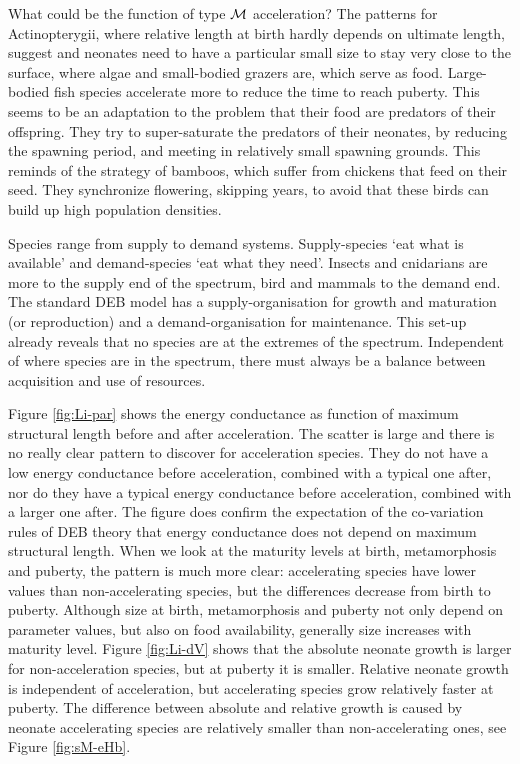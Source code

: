 What could be the function of type $\cal M$ acceleration?
The patterns for Actinopterygii, where relative length at birth hardly depends on ultimate length, suggest and neonates need to have a particular small size to stay very close to the surface, where algae and small-bodied grazers are, which serve as food. 
Large-bodied fish species accelerate more to reduce the time to reach puberty.
This seems to be an adaptation to the problem that their food are predators of their offspring.
They try to super-saturate the predators of their neonates, by reducing the spawning period, and meeting in relatively small spawning grounds.
This reminds of the strategy of bamboos, which suffer from chickens that feed on their seed. 
They synchronize flowering, skipping years, to avoid that these birds can build up high population densities.

Species range from supply to demand systems. 
Supply-species `eat what is available' and demand-species `eat what they need'.
Insects and cnidarians are more to the supply end of the spectrum, bird and mammals to the demand end.
The standard DEB model has a supply-organisation for growth and maturation (or reproduction) and a demand-organisation for maintenance.
This set-up already reveals that no species are at the extremes of the spectrum.
Independent of where species are in the spectrum, there must always be a balance between acquisition and use of resources.

Figure \ref{fig:Li-par} shows the energy conductance as function of maximum structural length before and after acceleration.
The scatter is large and there is no really clear pattern to discover for acceleration species.
They do not have a low energy conductance before acceleration, combined with a typical one after, nor do they have a typical energy conductance before acceleration, combined with a larger one after.
The figure does confirm the expectation of the co-variation rules of DEB theory that energy conductance does not depend on maximum structural length.
When we look at the maturity levels at birth, metamorphosis and puberty, the pattern is much more clear:
accelerating species have lower values than non-accelerating species, but the differences decrease from birth to puberty.
Although size at birth, metamorphosis and puberty not only depend on parameter values, but also on food availability, generally size increases with maturity level.
Figure \ref{fig:Li-dV} shows that the absolute neonate growth is larger for non-acceleration species, but at puberty it is smaller.
Relative neonate growth is independent of acceleration, but accelerating species grow relatively faster at puberty. 
The difference between absolute and relative growth is caused by neonate accelerating species are relatively smaller than non-accelerating ones, see Figure \ref{fig:sM-eHb}.

